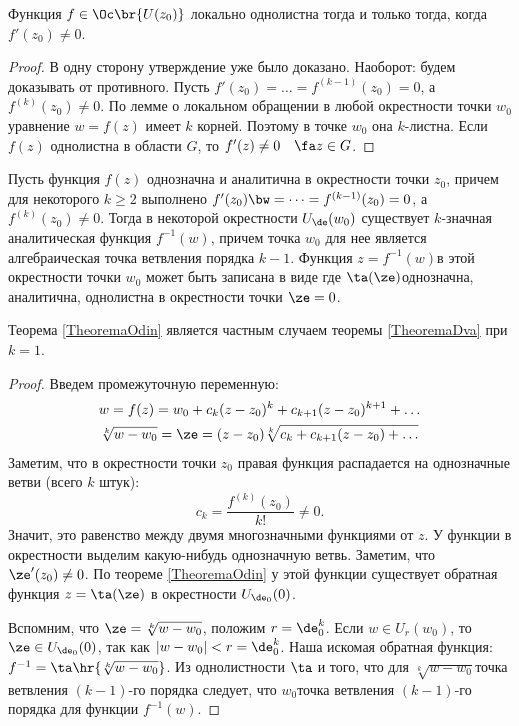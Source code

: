\documentclass[a4paper]{article}
\begin{document}
\begin{theorem}
\begin{imp}
Функция $f \in \Oc\br{U(z_0)}$ локально однолистна тогда и только тогда, когда $f'(z_0)\neq 0$.
\end{imp}
\begin{proof}
В одну сторону утверждение уже было доказано. Наоборот: будем доказывать от противного. Пусть
$f'(z_0)=\dots = f^{(k-1)}(z_0)=0$, а $f^{(k)}(z_0)\neq 0$.
По лемме о локальном обращении в любой окрестности точки $w_0$ уравнение
$w=f(z)$ имеет $k$ корней. Поэтому в точке $w_0$ она $k$-листна.
Если $f(z)$ однолистна в области $G$, то $f'(z)\neq 0 \quad \fa z\in G$.
\end{proof}

\begin{theorem}\label{TheoremaDva}
Пусть функция $f(z)$ однозначна и аналитична в окрестности точки $z_0$, причем для некоторого $k\ge 2$
выполнено $f'(z_0)\bw=\dots =f^{(k-1)}(z_0)=0$, а $f^{(k)}(z_0)\neq 0$. Тогда в некоторой окрестности
$U_\de(w_0)$ существует $k$-значная аналитическая функция $f^{-1}(w)$, причем точка
$w_0$ для нее является алгебраическая точка ветвления порядка $k-1$. Функция $z=f^{-1}(w)$в этой
окрестности точки $w_0$ может быть записана в виде
где $\ta(\ze)$\т однозначна, аналитична, однолистна в окрестности точки $\ze=0$.
\end{theorem}

\begin{note}
Теорема \ref{TheoremaOdin} является частным случаем теоремы \ref{TheoremaDva} при $k=1$.
\end{note}

\begin{proof}
Введем промежуточную переменную:
\begin{gather*}
w=f(z)=w_0+c_k(z-z_0)^k+c_{k+1}(z-z_0)^{k+1}+\dots\\
\sqrt[k]{w-w_0}=\ze=(z-z_0)\sqrt[k]{c_k+c_{k+1}(z-z_0)+\dots}
\end{gather*}
Заметим,  что в окрестности точки $z_0$ правая функция распадается на однозначные ветви (всего $k$ штук):
$$c_k=\frac{f^{(k)}(z_0)}{k!}\neq 0.$$
Значит, это равенство между двумя многозначными функциями от $z$. У функции
в окрестности выделим какую-нибудь однозначную ветвь. Заметим, что $\ze'(z_0)\neq 0$. По теореме \ref{TheoremaOdin}
у этой функции существует обратная функция $z=\ta(\ze)$ в окрестности $U_{\de_0}(0)$.

Вспомним, что $\ze = \sqrt[k]{w-w_0}$, положим $r = \de_0^k$. Если $w \in U_r(w_0)$, то
$\ze\in U_{\de_0}(0)$, так как $|w-w_0| < r = \de_0^k$. Наша искомая обратная функция:
$f^{-1} = \ta\hr{\sqrt[k]{w-w_0}}$. Из однолистности $\ta$ и того, что для
$\sqrt[k]{w-w_0}$\т точка ветвления $(k-1)$-го порядка следует, что $w_0$\т точка
ветвления $(k-1)$-го порядка для функции $f^{-1}(w)$.
\end{proof}


\end{theorem}
\end{document}

